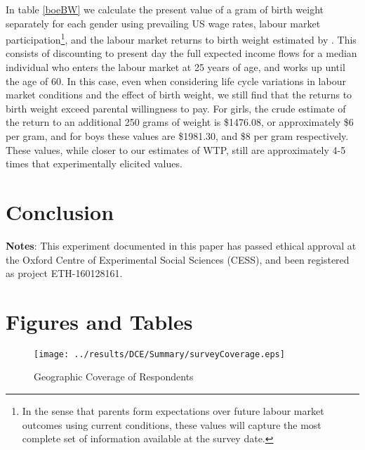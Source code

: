 \documentclass[a4paper, 11pt]{article}
\begin{document}
\begin{spacing}{1.4}
In table \ref{boeBW} we calculate the present value of a gram of
birth weight separately for each gender using prevailing US wage
rates, labour market participation\footnote{In the sense that parents
  form expectations over future labour market outcomes using current
  conditions, these values will capture the most complete set of
  information available at the survey date.}, and the labour market
returns to birth weight estimated by \citet{Bharadwajetal2015}.  This
consists of discounting to present day the full expected income
flows for a median individual who enters the labour market at 25 years
of age, and works up until the age of 60.  In this case, even when
considering life cycle variations in labour market conditions and the
effect of birth weight, we still find that the returns to birth weight
exceed parental willingness to pay.  For girls, the crude estimate of
the return to an additional 250 grams of weight is \$1476.08, or
approximately \$6 per gram, and for boys these values are \$1981.30,
and \$8 per gram respectively.  These values, while closer to our
estimates of WTP, still are approximately 4-5 times that experimentally
elicited values.



\section{Conclusion}
\label{scn:conclusion}

\newpage
\noindent\textbf{Notes}: This experiment documented in this paper has passed ethical approval at the Oxford Centre of Experimental Social Sciences (CESS), and been registered as project ETH-160128161.



\clearpage
\end{spacing}
\section*{Figures and Tables}
\begin{figure}[htpb!]
  \begin{center}
    \caption{Geographic Coverage of Respondents}
    \label{geography}
  \texttt{[image: ../results/DCE/Summary/surveyCoverage.eps]}
  \end{center}
\end{figure}
\end{document}
